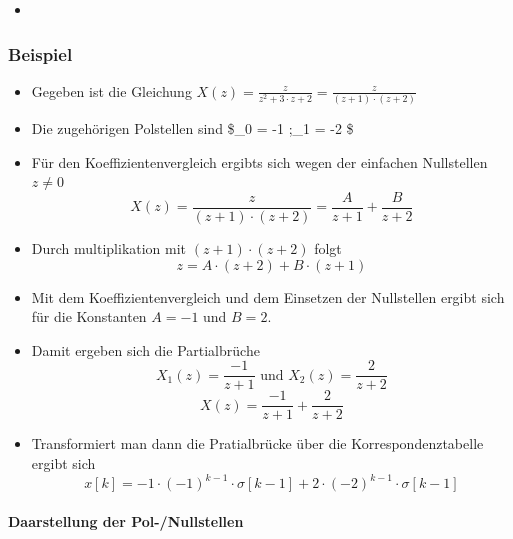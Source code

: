 \documentclass[11pt]{article}
\providecommand{\tightlist}{%
      \setlength{\itemsep}{0pt}\setlength{\parskip}{0pt}}
\begin{document}
\begin{itemize}
\item
\end{itemize}

    \subsubsection{Beispiel}\label{beispiel}

\begin{itemize}
\tightlist
\item
  Gegeben ist die Gleichung
  \(X(z) = \frac{z}{z^2 + 3 \cdot z + 2} = \frac{z}{(z+1) \cdot (z+2)}\)
\item
  Die zugehörigen Polstellen sind \$\alpha\_0 = -1 ;\alpha\_1 = -2 \$
\item
  Für den Koeffizientenvergleich ergibts sich wegen der einfachen
  Nullstellen \(z \neq 0\)
  \[X(z) = \frac{z}{(z+1) \cdot (z+2)} = \frac{A}{z+1} + \frac{B}{z+2}\]
\item
  Durch multiplikation mit \((z+1) \cdot (z+2)\) folgt
  \[ z = A \cdot (z+2) + B \cdot (z+1)\]
\item
  Mit dem Koeffizientenvergleich und dem Einsetzen der Nullstellen
  ergibt sich für die Konstanten \(A = -1\) und \(B = 2\).
\item
  Damit ergeben sich die Partialbrüche
  \[ X_1(z) = \frac{-1}{z+1} \textrm{  und  } X_2(z) = \frac{2}{z+2}\]
  \[ X(z) = \frac{-1}{z+1} + \frac{2}{z+2}\]
\item
  Transformiert man dann die Pratialbrücke über die Korrespondenztabelle
  ergibt sich
  \[x[k] = -1 \cdot (-1)^{k-1} \cdot \sigma[k-1] + 2 \cdot (-2)^{k-1} \cdot \sigma[k-1]\]
\end{itemize}

    \paragraph{Daarstellung der
Pol-/Nullstellen}\label{daarstellung-der-pol-nullstellen}
\end{document}
